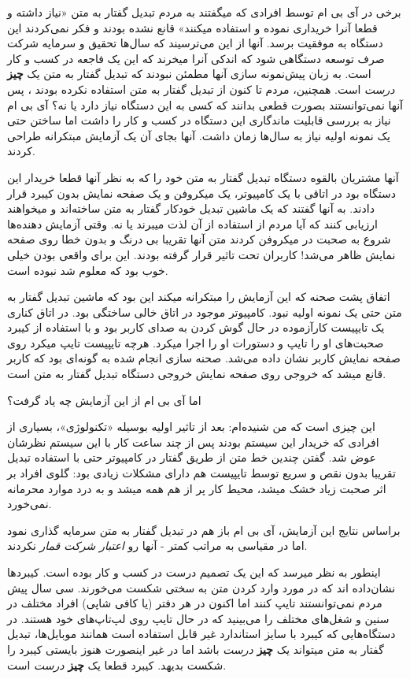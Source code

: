 برخی در آی بی ام توسط افرادی که میگفتند به مردم تبدیل گفتار به متن «نیاز
داشته و قطعا آنرا خریداری نموده و استفاده میکنند» قانع نشده بودند و فکر
نمی‌کردند این دستگاه به موفقیت برسد. آنها از این می‌ترسیند که سال‌ها
تحقیق و سرمایه شرکت صرف توسعه دستگاهی شود که اندکی آنرا میخرند که این یک
فاجعه در کسب و کار است. به زبان پیش‌نمونه سازی آنها مطمئن نبودند که
تبدیل گفتار به متن یک \textbf{چیز} \emph{درست} است. همچنین، مردم تا کنون
از تبدیل گفتار به متن استفاده نکرده بودند ، پس آنها نمی‌توانستند بصورت
قطعی بدانند که کسی به این دستگاه نیاز دارد یا نه؟ آی بی ام نیاز به بررسی
قابلیت ماندگاری این دستگاه در کسب و کار را داشت اما ساختن حتی یک نمونه
اولیه نیاز به سال‌ها زمان داشت. آنها بجای آن یک آزمایش مبتکرانه طراحی
کردند.

آنها مشتریان بالقوه دستگاه تبدیل گفتار به متن خود را که به نظر آنها قطعا
خریدار این دستگاه بود در اتاقی با یک کامپیوتر، یک میکروفن و یک صفحه
نمایش بدون کیبرد قرار دادند. به آنها گفتند که یک ماشین تبدیل خودکار
گفتار به متن ساخته‌اند و میخواهند ارزیابی کنند که آیا مردم از استفاده از
آن لذت میبرند یا نه. وقتی آزمایش دهنده‌ها شروع به صحبت در میکروفن کردند
متن آنها تقریبا بی درنگ و بدون خطا روی صفحه نمایش ظاهر می‌شد! کاربران
تحت تاثیر قرار گرفته بودند. این برای واقعی بودن خیلی خوب بود که معلوم شد
نبوده است.

اتفاق پشت صحنه که این آزمایش را مبتکرانه میکند این بود که ماشین تبدیل
گفتار به متن حتی یک نمونه اولیه نبود. کامپیوتر موجود در اتاق خالی ساختگی
بود. در اتاق کناری یک تایپیست کارآزموده در حال گوش کردن به صدای کاربر
بود و با استفاده از کیبرد صحبت‌های او را تایپ و دستورات او را اجرا
میکرد. هرچه تایپیست تایپ میکرد روی صفحه نمایش کاربر نشان داده می‌شد.
صحنه سازی انجام شده به گونه‌ای بود که کاربر قانع میشد که خروجی روی صفحه
نمایش خروجی دستگاه تبدیل گفتار به متن است.

اما آی بی ام از این آزمایش چه یاد گرفت؟

این چیزی است که من شنیده‌ام: بعد از تاثیر اولیه بوسیله «تکنولوژی»،
بسیاری از افرادی که خریدار این سیستم بودند پس از چند ساعت کار با این
سیستم نظرشان عوض شد. گفتن چندین خط متن از طریق گفتار در کامپیوتر حتی با
استفاده تبدیل تقریبا بدون نقص و سریع توسط تایپیست هم دارای مشکلات زیادی
بود: گلوی افراد بر اثر صحبت زیاد خشک میشد، محیط کار پر از هم همه میشد و
به درد موارد محرمانه نمی‌خورد.

براساس نتایج این آزمایش، آی بی ام باز هم در تبدیل گفتار به متن سرمایه
گذاری نمود اما در مقیاسی به مراتب کمتر - آنها رو \emph{اعتبار شرکت قمار}
نکردند.

اینطور به نظر میرسد که این یک تصمیم درست در کسب و کار بوده است. کیبردها
نشان‌داده اند که در مورد وارد کردن متن به سختی شکست می‌خورند. سی سال پیش
مردم نمی‌توانستند تایپ کنند اما اکنون در هر دفتر (یا کافی شاپی) افراد
مختلف در سنین و شغل‌های مختلف را می‌بینید که در حال تایپ روی لپ‌تاپ‌های
خود هستند. در دستگاه‌هایی که کیبرد با سایز استاندارد غیر قابل استفاده
است همانند موبایل‌ها، تبدیل گفتار به متن میتواند یک \textbf{چیز}
\emph{درست} باشد اما در غیر اینصورت هنوز بایستی کیبرد را شکست بدیهد.
کیبرد قطعا یک \textbf{چیز} \emph{درست} است.

